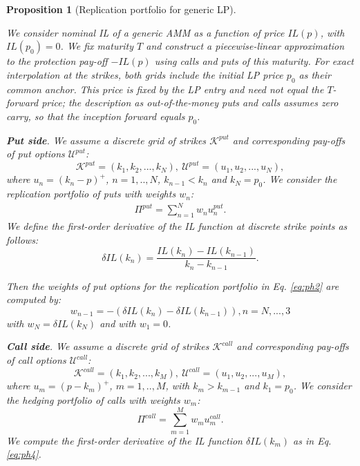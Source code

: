 \documentclass[pdftex,11pt,a4paper] {article}
\newtheorem{proposition}{Proposition}[section]
\begin{document}
\begin{proposition}[Replication portfolio for generic LP]
\label{prop:replication_lp}

We consider nominal IL of a generic AMM as a function of price $IL(p)$, with $IL(p_{0})=0$. We fix maturity $T$ and construct a piecewise-linear approximation to the protection pay-off $-IL(p)$ using calls and puts of this maturity. For exact interpolation at the strikes, both grids include the initial LP price $p_{0}$ as their common anchor. This price is fixed by the LP entry and need not equal the $T$-forward price; the description as out-of-the-money puts and calls assumes zero carry, so that the inception forward equals $p_{0}$.

\textbf{Put side}. We assume a discrete grid of strikes $\mathcal{K}^{put}$
and corresponding pay-offs of put options $\mathcal{U}^{put}$:
\begin{equation}  \label{eq:ph1}
\mathcal{K}^{put} = \left(k_{1}, k_{2},...,k_{N} \right), \ \mathcal{U}%
^{put} = \left(u_{1}, u_{2},...,u_{N} \right),
\end{equation}
where $u_n=(k_n-p)^+$, $n=1,..,N$, $k_{n-1} < k_{n}$ and $k_{N}=p_{0}$.
We consider the replication portfolio
of puts with weights $w_n$:
\begin{equation}  \label{eq:ph2}
\begin{split}
\Pi^{put} = \sum^{N}_{n=1}w_{n}u^{put}_{n}.
\end{split}%
\end{equation}
We define the first-order derivative of the IL function at discrete strike
points as follows:
\begin{equation}  \label{eq:ph4}
\delta IL(k_{n}) = \frac{IL(k_{n})-IL(k_{n-1})}{k_{n}-k_{n-1}}.
\end{equation}

Then the weights of put options for the replication portfolio in Eq. %
\eqref{eq:ph2} are computed by:
\begin{equation}  \label{eq:ph5}
w_{n-1} = -\left(\delta IL(k_{n})- \delta IL(k_{n-1})\right), n=N, ...,3
\end{equation}
with $w_{N} = \delta IL(k_{N})$ and with $w_{1}=0$.

\textbf{Call side}. We assume a discrete grid of strikes $\mathcal{K}^{call}$ and
corresponding pay-offs of call options $\mathcal{U}^{call}$:
\begin{equation}  \label{eq:phc1}
\mathcal{K}^{call} = \left(k_{1}, k_{2},...,k_{M} \right), \ \mathcal{U}%
^{call} = \left(u_{1}, u_{2},...,u_{M} \right),
\end{equation}
where $u_m=(p-k_m)^+$, $m=1,..,M$, with $k_{m} > k_{m-1}$ and $k_{1}=p_{0}$.
We consider the hedging portfolio of calls
with weights $w_m$:
\begin{equation}  \label{eq:phc2}
\Pi^{call} = \sum^{M}_{m=1}w_{m}u^{call}_{m}.
\end{equation}
We compute the first-order derivative of the IL function $\delta IL(k_{m})$
as in Eq. \eqref{eq:ph4}.


\end{proposition}
\end{document}

